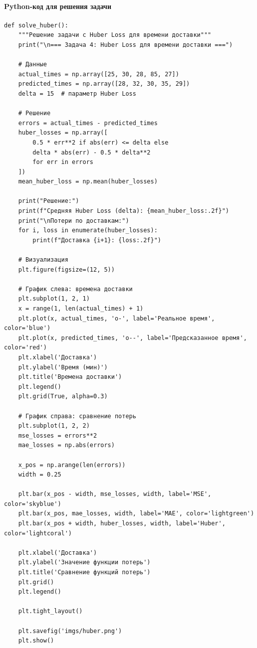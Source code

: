 \paragraph*{Python-код для решения задачи}

\begin{verbatim}
def solve_huber():
    """Решение задачи с Huber Loss для времени доставки"""
    print("\n=== Задача 4: Huber Loss для времени доставки ===")
    
    # Данные
    actual_times = np.array([25, 30, 28, 85, 27])
    predicted_times = np.array([28, 32, 30, 35, 29])
    delta = 15  # параметр Huber Loss
    
    # Решение
    errors = actual_times - predicted_times
    huber_losses = np.array([
        0.5 * err**2 if abs(err) <= delta else
        delta * abs(err) - 0.5 * delta**2
        for err in errors
    ])
    mean_huber_loss = np.mean(huber_losses)
    
    print("Решение:")
    print(f"Средняя Huber Loss (delta): {mean_huber_loss:.2f}")
    print("\nПотери по доставкам:")
    for i, loss in enumerate(huber_losses):
        print(f"Доставка {i+1}: {loss:.2f}")
    
    # Визуализация
    plt.figure(figsize=(12, 5))
    
    # График слева: времена доставки
    plt.subplot(1, 2, 1)
    x = range(1, len(actual_times) + 1)
    plt.plot(x, actual_times, 'o-', label='Реальное время', color='blue')
    plt.plot(x, predicted_times, 'o--', label='Предсказанное время', color='red')
    plt.xlabel('Доставка')
    plt.ylabel('Время (мин)')
    plt.title('Времена доставки')
    plt.legend()
    plt.grid(True, alpha=0.3)
    
    # График справа: сравнение потерь
    plt.subplot(1, 2, 2)
    mse_losses = errors**2
    mae_losses = np.abs(errors)
    
    x_pos = np.arange(len(errors))
    width = 0.25
    
    plt.bar(x_pos - width, mse_losses, width, label='MSE', color='skyblue')
    plt.bar(x_pos, mae_losses, width, label='MAE', color='lightgreen')
    plt.bar(x_pos + width, huber_losses, width, label='Huber', color='lightcoral')
    
    plt.xlabel('Доставка')
    plt.ylabel('Значение функции потерь')
    plt.title('Сравнение функций потерь')
    plt.grid()
    plt.legend()
    
    plt.tight_layout()
    
    plt.savefig('imgs/huber.png')
    plt.show()
\end{verbatim}
